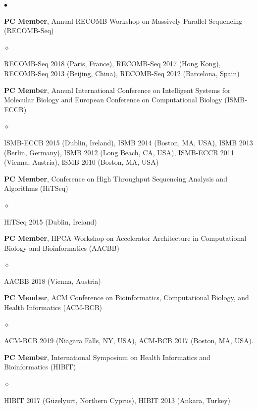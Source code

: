 \documentclass[margin,line]{res}
\newenvironment{list2}{
  \begin{list}{$\bullet$}{%
      \setlength{\itemsep}{0.1cm}
      \setlength{\parsep}{0in} \setlength{\parskip}{0in}
      \setlength{\topsep}{0in} \setlength{\partopsep}{0in} 
      \setlength{\leftmargin}{0.2in}}}{\end{list}}
\newenvironment{list3}{
  \begin{list}{$\diamond$}{%
      \setlength{\itemsep}{0in}
      \setlength{\parsep}{0.1cm} \setlength{\parskip}{0.1cm}
      \setlength{\topsep}{0.1cm} \setlength{\partopsep}{0.1cm} 
      \setlength{\leftmargin}{0.2in}}}{\end{list}}
\begin{document}
\begin{resume}
\begin{list2}
\item 
\textbf{PC Member},  Annual RECOMB Workshop on Massively Parallel Sequencing (RECOMB-Seq)
\begin{list3}
    \item RECOMB-Seq 2018 (Paris, France), RECOMB-Seq 2017 (Hong Kong), RECOMB-Seq 2013 (Beijing, China), RECOMB-Seq 2012 (Barcelona, Spain)
\end{list3}

\item
  \textbf{PC Member}, Annual International Conference on Intelligent Systems for Molecular Biology and  European Conference on 
  Computational Biology  (ISMB-ECCB)
  \begin{list3}
  \item ISMB-ECCB 2015 (Dublin, Ireland), ISMB 2014 (Boston, MA, USA), ISMB 2013 (Berlin, Germany), ISMB 2012 (Long Beach, CA, USA), ISMB-ECCB 2011 (Vienna, Austria), ISMB 2010 (Boston, MA, USA)
  \end{list3}

\clearpage

\item
  \textbf{PC Member}, Conference on High Throughput Sequencing Analysis and Algorithms (HiTSeq)
  \begin{list3}
      \item HiTSeq 2015 (Dublin, Ireland)
  \end{list3}

\item
  \textbf{PC Member}, 
HPCA Workshop on Accelerator Architecture in Computational Biology and Bioinformatics (AACBB)
\begin{list3}
    \item AACBB 2018 (Vienna, Austria)
\end{list3}
\item
  \textbf{PC Member},  ACM Conference on Bioinformatics, Computational Biology, and Health Informatics
  (ACM-BCB)
  \begin{list3}
    \item ACM-BCB 2019 (Niagara Falls, NY, USA), ACM-BCB 2017 (Boston, MA, USA).
  \end{list3}
  
\item
  \textbf{PC Member},  International Symposium on Health Informatics and Bioinformatics
  (HIBIT)
  \begin{list3}
  \item HIBIT 2017 (Güzelyurt, Northern Cyprus), HIBIT 2013 (Ankara, Turkey)
  \end{list3}


\end{list2}
\end{resume}
\end{document}
